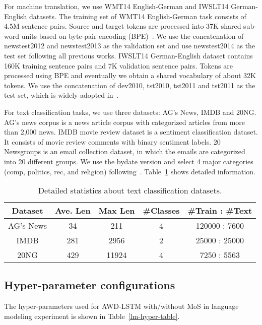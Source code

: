 \documentclass{article}
\begin{document}
For machine translation, we use WMT14 English-German and IWSLT14 German-English datasets. The training set of WMT14 English-German task consists of 4.5M sentence pairs. Source and target tokens are processed into 37K shared sub-word units based on byte-pair encoding (BPE)~\cite{sennrich2015neural}. We use the concatenation of newstest2012 and newstest2013 as the validation set and use newstest2014 as the test set following all previous works. IWSLT14 German-English dataset contains 160K training sentence pairs and 7K validation sentence pairs. Tokens are processed using BPE and eventually we obtain a shared vocabulary of about 32K tokens. We use the concatenation of dev2010, tst2010, tst2011 and tst2011 as the test set, which is widely adopted in~\cite{ranzato2015sequence,huang2017neural,bahdanau2016actor}.



For text classification tasks, we use three datasets: AG's News, IMDB and 20NG. AG’s news corpus is a news article corpus with categorized articles from more than 2,000 news. IMDB movie review dataset is a sentiment classification dataset. It consists of movie review comments with binary sentiment labels. 20 Newsgroups is an email collection dataset, in which the emails are categorized into 20 different groups. We use the bydate version and select 4 major categories (comp, politics, rec, and religion) following~\cite{DBLP:conf/sigir/HingmireCPC13}.
Table~\ref{Classification-data-table} shows detailed information.

\begin{table}[!htbp]
\begin{center}
		\begin{tabular}{ccccc}
			\toprule
            Dataset & Ave. Len & Max Len & \#Classes & \#Train : \#Text \\
            \hline
			AG's News & 34 & 211 & 4 & 120000 : 7600 \\
            \hline
            IMDB & 281 & 2956 & 2 & 25000 : 25000 \\
            \hline
            20NG & 429 & 11924 & 4 & 7250 : 5563 \\
            \bottomrule
		\end{tabular}
	\end{center}
	\caption{\label{Classification-data-table} Detailed statistics about text classification datasets.}
\end{table}

\subsection{Hyper-parameter configurations}
The hyper-parameters used for AWD-LSTM with/without MoS in language modeling experiment is shown in Table~\ref{lm-hyper-table}.
\end{document}
